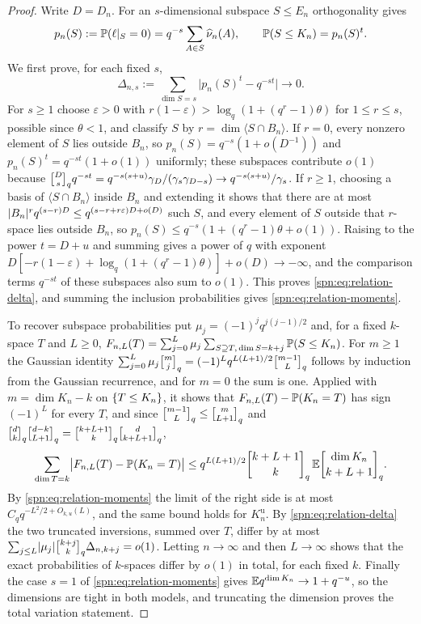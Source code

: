 \begin{proof}
Write $D=D_n$. For an $s$-dimensional subspace $S\le E_n$ orthogonality gives
\[
 p_n(S):=\mathbb{P}(\ell|_S=0)=q^{-s}\sum_{A\in S}\widehat\nu_n(A),\qquad \mathbb{P}(S\le K_n)=p_n(S)^t.
\]
We first prove, for each fixed $s$,
\begin{equation}\label{spn:eq:relation-delta}
 \Delta_{n,s}:=\sum_{\dim S=s}\bigl|p_n(S)^t-q^{-st}\bigr|\longrightarrow0.
\end{equation}
For $s\ge1$ choose $\varepsilon>0$ with $r(1-\varepsilon)>\log_q(1+(q^r-1)\theta)$ for $1\le r\le s$,
possible since $\theta<1$, and classify $S$ by $r=\dim\langle S\cap B_n\rangle$. If $r=0$, every
nonzero element of $S$ lies outside $B_n$, so $p_n(S)=q^{-s}(1+o(D^{-1}))$ and
$p_n(S)^t=q^{-st}(1+o(1))$ uniformly; these subspaces contribute $o(1)$ because
$\spnqbin Ds{q}q^{-st}=q^{-s(s+u)}\gamma_D/(\gamma_s\gamma_{D-s})\to q^{-s(s+u)}/\gamma_s$. If
$r\ge1$, choosing a basis of $\langle S\cap B_n\rangle$ inside $B_n$ and extending it shows that there
are at most $\lvert B_n\rvert^rq^{(s-r)D}\le q^{(s-r+r\varepsilon)D+o(D)}$ such $S$, and every element of $S$
outside that $r$-space lies outside $B_n$, so $p_n(S)\le q^{-s}(1+(q^r-1)\theta+o(1))$. Raising to the
power $t=D+u$ and summing gives a power of $q$ with exponent
$D[-r(1-\varepsilon)+\log_q(1+(q^r-1)\theta)]+o(D)\to-\infty$, and the comparison terms $q^{-st}$ of
these subspaces also sum to $o(1)$. This proves \eqref{spn:eq:relation-delta}, and summing the
inclusion probabilities gives \eqref{spn:eq:relation-moments}.

To recover subspace probabilities put $\mu_j=(-1)^jq^{j(j-1)/2}$ and, for a fixed $k$-space $T$ and
$L\ge0$, $F_{n,L}(T)=\sum_{j=0}^L\mu_j\sum_{S\supseteq T,\,\dim S=k+j}\mathbb{P}(S\le K_n)$. For $m\ge1$
the Gaussian identity $\sum_{j=0}^L\mu_j\spnqbin mj{q}=(-1)^Lq^{L(L+1)/2}\spnqbin{m-1}L{q}$ follows
by induction from the Gaussian recurrence, and for $m=0$ the sum is one. Applied with
$m=\dim K_n-k$ on $\{T\le K_n\}$, it shows that $F_{n,L}(T)-\mathbb{P}(K_n=T)$ has sign $(-1)^L$ for
every $T$, and since $\spnqbin{m-1}L{q}\le\spnqbin m{L+1}{q}$ and
$\spnqbin dk{q}\spnqbin{d-k}{L+1}{q}=\spnqbin{k+L+1}k{q}\spnqbin d{k+L+1}{q}$,
\[
 \sum_{\dim T=k}\bigl|F_{n,L}(T)-\spnP(K_n=T)\bigr|\le
 q^{L(L+1)/2}\spnqbin{k+L+1}k{q}\,\spnE\spnqbin{\dim K_n}{k+L+1}{q}.
\]
By \eqref{spn:eq:relation-moments} the limit of the right side is at most $C_qq^{-L^2/2+O_{k,u}(L)}$,
and the same bound holds for $K_n^{\mathrm u}$. By \eqref{spn:eq:relation-delta} the two truncated
inversions, summed over $T$, differ by at most $\sum_{j\le L}\abs{\mu_j}\spnqbin{k+j}k{q}\Delta_{n,k+j}=o(1)$.
Letting $n\to\infty$ and then $L\to\infty$ shows that the exact probabilities of $k$-spaces differ by
$o(1)$ in total, for each fixed $k$. Finally the case $s=1$ of \eqref{spn:eq:relation-moments} gives
$\mathbb{E} q^{\dim K_n}\to1+q^{-u}$, so the dimensions are tight in both models, and truncating the
dimension proves the total variation statement.
\end{proof}

